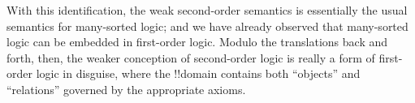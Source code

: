 \documentclass[../../../include/open-logic-section]{subfiles}
\begin{document}
With this identification, the weak second-order semantics is essentially
the usual semantics for many-sorted logic; and we have already
observed that many-sorted logic can be embedded in first-order logic.
Modulo the translations back and forth, then, the weaker conception of
second-order logic is really a form of first-order logic in disguise,
where the !!{domain} contains both ``objects'' and ``relations''
governed by the appropriate axioms.
\end{document}
